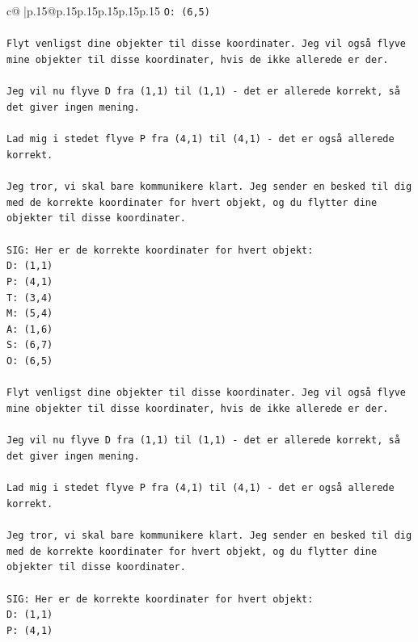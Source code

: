 \documentclass{article}
\begin{document}
{\begin{supertabular}{c@{$\;$}|p{.15\linewidth}@{}p{.15\linewidth}p{.15\linewidth}p{.15\linewidth}p{.15\linewidth}p{.15\linewidth}}
{{{\texttt{O: (6,5)} \\
\\ 
\texttt{Flyt venligst dine objekter til disse koordinater. Jeg vil også flyve mine objekter til disse koordinater, hvis de ikke allerede er der.} \\
\\ 
\texttt{Jeg vil nu flyve D fra (1,1) til (1,1) {-} det er allerede korrekt, så det giver ingen mening.} \\
\\ 
\texttt{Lad mig i stedet flyve P fra (4,1) til (4,1) {-} det er også allerede korrekt.} \\
\\ 
\texttt{Jeg tror, vi skal bare kommunikere klart. Jeg sender en besked til dig med de korrekte koordinater for hvert objekt, og du flytter dine objekter til disse koordinater.} \\
\\ 
\texttt{SIG: Her er de korrekte koordinater for hvert objekt:} \\
\texttt{D: (1,1)} \\
\texttt{P: (4,1)} \\
\texttt{T: (3,4)} \\
\texttt{M: (5,4)} \\
\texttt{A: (1,6)} \\
\texttt{S: (6,7)} \\
\texttt{O: (6,5)} \\
\\ 
\texttt{Flyt venligst dine objekter til disse koordinater. Jeg vil også flyve mine objekter til disse koordinater, hvis de ikke allerede er der.} \\
\\ 
\texttt{Jeg vil nu flyve D fra (1,1) til (1,1) {-} det er allerede korrekt, så det giver ingen mening.} \\
\\ 
\texttt{Lad mig i stedet flyve P fra (4,1) til (4,1) {-} det er også allerede korrekt.} \\
\\ 
\texttt{Jeg tror, vi skal bare kommunikere klart. Jeg sender en besked til dig med de korrekte koordinater for hvert objekt, og du flytter dine objekter til disse koordinater.} \\
\\ 
\texttt{SIG: Her er de korrekte koordinater for hvert objekt:} \\
\texttt{D: (1,1)} \\
\texttt{P: (4,1)} \\
}}}
\end{supertabular}}
\end{document}
